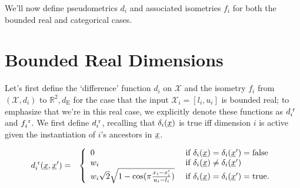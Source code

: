\documentclass[letterpaper]{article}
\newcommand{\vect}[1]{\underline{\smash{#1}}}
\renewcommand{\v}[1]{\vect{#1}}
\newcommand{\reals}{\mathds{R}}
\newcommand{\sX}{\mathcal{X}}
\newcommand{\br}{^{\text{\textnormal{ r}}}}
\begin{document}
We'll now define pseudometrics $d_i$ and associated isometries $f_i$ for both the bounded real and categorical cases. 


\section{Bounded Real Dimensions}

Let's first define the `difference' function $d_i$ on $\sX$ and the isometry $f_i$ from $(\sX, d_i)$ to $\reals^2,d_\text{E}$ for the case that the input $\sX_i=[l_i, u_i]$ is bounded real; to emphasize that we're in this real case, we 
explicitly denote these functions as $d\br_i$ and $f\br_i$. We first define $d\br_i$, recalling that $\delta_i(\v{x})$ is true iff dimension $i$ is active given the instantiation of $i$'s ancestors in $\v{x}$.

\begin{eqnarray}
\nonumber{}d\br_i(\v{x}, \v{x}') & = & \left\{\begin{array}{ll}
\nonumber{} 0 & \textrm{ if } \delta_i(\v{x}) = \delta_i(\v{x}') = \textrm{false}\\
\nonumber{} w_i & \textrm{ if } \delta_i(\v{x}) \neq \delta_i(\v{x}')\\
\nonumber{} w_i \sqrt{2} \sqrt{1 - \cos(\pi \frac{x_i-x_i'}{u_i-l_i})} & \textrm{ if } \delta_i(\v{x}) = \delta_i(\v{x}') = \textrm{true}. \end{array}\right.
\end{eqnarray}
\end{document}
